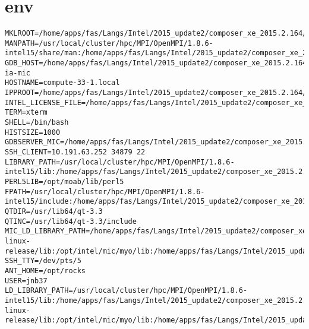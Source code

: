 \documentclass[11pt]{article}
\begin{document}
\section{env}
\label{sec:orgacd3523}
\begin{verbatim}
MKLROOT=/home/apps/fas/Langs/Intel/2015_update2/composer_xe_2015.2.164/mkl
MANPATH=/usr/local/cluster/hpc/MPI/OpenMPI/1.8.6-intel15/share/man:/home/apps/fas/Langs/Intel/2015_update2/composer_xe_2015.2.164/man/en_US:/home/apps/fas/Langs/Intel/2015_update2/composer_xe_2015.2.164/debugger/gdb/intel64/share/man/:/home/apps/fas/Langs/Intel/2015_update2/composer_xe_2015.2.164/debugger/gdb/intel64_mic/share/man/:/usr/share/man:/opt/moab/share/man:
GDB_HOST=/home/apps/fas/Langs/Intel/2015_update2/composer_xe_2015.2.164/debugger/gdb/intel64_mic/bin/gdb-ia-mic
HOSTNAME=compute-33-1.local
IPPROOT=/home/apps/fas/Langs/Intel/2015_update2/composer_xe_2015.2.164/ipp
INTEL_LICENSE_FILE=/home/apps/fas/Langs/Intel/2015_update2/composer_xe_2015.2.164/licenses:/opt/intel/licenses:/home/apps/fas/Licenses/intel_site.lic
TERM=xterm
SHELL=/bin/bash
HISTSIZE=1000
GDBSERVER_MIC=/home/apps/fas/Langs/Intel/2015_update2/composer_xe_2015.2.164/debugger/gdb/target/mic/bin/gdbserver
SSH_CLIENT=10.191.63.252 34879 22
LIBRARY_PATH=/usr/local/cluster/hpc/MPI/OpenMPI/1.8.6-intel15/lib:/home/apps/fas/Langs/Intel/2015_update2/composer_xe_2015.2.164/ipp/../compiler/lib/intel64:/home/apps/fas/Langs/Intel/2015_update2/composer_xe_2015.2.164/ipp/lib/intel64:/home/apps/fas/Langs/Intel/2015_update2/composer_xe_2015.2.164/compiler/lib/intel64:/home/apps/fas/Langs/Intel/2015_update2/composer_xe_2015.2.164/mkl/lib/intel64:/home/apps/fas/Langs/Intel/2015_update2/composer_xe_2015.2.164/tbb/lib/intel64/gcc4.4
PERL5LIB=/opt/moab/lib/perl5
FPATH=/usr/local/cluster/hpc/MPI/OpenMPI/1.8.6-intel15/include:/home/apps/fas/Langs/Intel/2015_update2/composer_xe_2015.2.164/mkl/include
QTDIR=/usr/lib64/qt-3.3
QTINC=/usr/lib64/qt-3.3/include
MIC_LD_LIBRARY_PATH=/home/apps/fas/Langs/Intel/2015_update2/composer_xe_2015.2.164/mpirt/lib/mic:/home/apps/fas/Langs/Intel/2015_update2/composer_xe_2015.2.164/ipp/lib/mic:/home/apps/fas/Langs/Intel/2015_update2/composer_xe_2015.2.164/compiler/lib/mic:/home/apps/fas/Langs/Intel/2015_update2/composer_xe_2015.2.164/mkl/lib/mic:/opt/intel/mic/coi/device-linux-release/lib:/opt/intel/mic/myo/lib:/home/apps/fas/Langs/Intel/2015_update2/composer_xe_2015.2.164/tbb/lib/mic
SSH_TTY=/dev/pts/5
ANT_HOME=/opt/rocks
USER=jnb37
LD_LIBRARY_PATH=/usr/local/cluster/hpc/MPI/OpenMPI/1.8.6-intel15/lib:/home/apps/fas/Langs/Intel/2015_update2/composer_xe_2015.2.164/mpirt/lib/intel64:/home/apps/fas/Langs/Intel/2015_update2/composer_xe_2015.2.164/ipp/../compiler/lib/intel64:/home/apps/fas/Langs/Intel/2015_update2/composer_xe_2015.2.164/ipp/lib/intel64:/home/apps/fas/Langs/Intel/2015_update2/composer_xe_2015.2.164/ipp/tools/intel64/perfsys:/opt/intel/mic/coi/host-linux-release/lib:/opt/intel/mic/myo/lib:/home/apps/fas/Langs/Intel/2015_update2/composer_xe_2015.2.164/compiler/lib/intel64:/home/apps/fas/Langs/Intel/2015_update2/composer_xe_2015.2.164/mkl/lib/intel64:/home/apps/fas/Langs/Intel/2015_update2/composer_xe_2015.2.164/tbb/lib/intel64/gcc4.4:/home/apps/fas/Langs/Intel/2015_update2/composer_xe_2015.2.164/debugger/ipt/intel64/lib

\end{verbatim}
\end{document}
